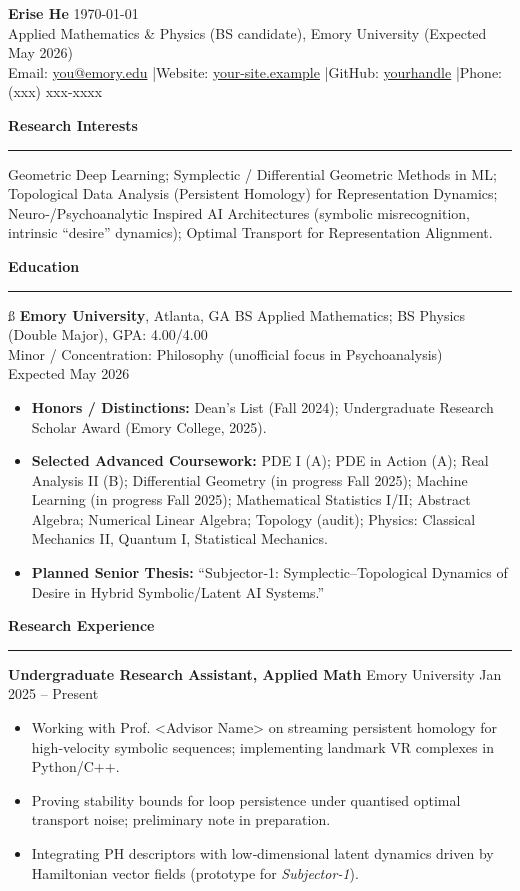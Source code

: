 \documentclass[11pt]{article}
\newcommand{\cvsection}[1]{%
  \vspace{1.25em}%
  \textbf{\large #1}%
  \vspace{0.5em}\hrule\vspace{0.6em}
}
\newcommand{\cvheading}[3]{\textbf{#1} \hfill #2 \hfill #3}
\newcommand{\cvedu}[5]{%
  \textbf{#1}, #2 \hfill #3\\%
  #4 \\
  #5 \par
}
\newenvironment{cvitems}{\begin{itemize}[leftmargin=*,topsep=2pt,itemsep=2pt]}{\end{itemize}}
\begin{document}
{\LARGE \textbf{Erise He}} \hfill \today\\
Applied Mathematics \& Physics (BS candidate), Emory University (Expected May 2026)\\
Email: \href{mailto:you@emory.edu}{you@emory.edu} \quad|\quad Website: \href{https://your-site.example}{your-site.example} \quad|\quad GitHub: \href{https://github.com/yourhandle}{yourhandle} \quad|\quad Phone: (xxx) xxx-xxxx

\cvsection{Research Interests}
Geometric Deep Learning; Symplectic / Differential Geometric Methods in ML; Topological Data Analysis (Persistent Homology) for Representation Dynamics; Neuro‑/Psychoanalytic Inspired AI Architectures (symbolic misrecognition, intrinsic “desire” dynamics); Optimal Transport for Representation Alignment.

\cvsection{Education}ß
\cvedu{Emory University}{Atlanta, GA}{BS Applied Mathematics; BS Physics (Double Major), GPA: 4.00/4.00}{Minor / Concentration: Philosophy (unofficial focus in Psychoanalysis)}{Expected May 2026}

\begin{cvitems}
  \item \textbf{Honors / Distinctions:} Dean’s List (Fall 2024); Undergraduate Research Scholar Award (Emory College, 2025).
  \item \textbf{Selected Advanced Coursework:} PDE I (A); PDE in Action (A); Real Analysis II (B); Differential Geometry (in progress Fall 2025); Machine Learning (in progress Fall 2025); Mathematical Statistics I/II; Abstract Algebra; Numerical Linear Algebra; Topology (audit); Physics: Classical Mechanics II, Quantum I, Statistical Mechanics.
  \item \textbf{Planned Senior Thesis:} “Subjector‑1: Symplectic–Topological Dynamics of Desire in Hybrid Symbolic/Latent AI Systems.”
\end{cvitems}

\cvsection{Research Experience}

\cvheading{Undergraduate Research Assistant, Applied Math}{Emory University}{Jan 2025 -- Present}
\begin{cvitems}
  \item Working with Prof. <Advisor Name> on streaming persistent homology for high‑velocity symbolic sequences; implementing landmark VR complexes in Python/C++.
  \item Proving stability bounds for loop persistence under quantised optimal transport noise; preliminary note in preparation.
  \item Integrating PH descriptors with low‑dimensional latent dynamics driven by Hamiltonian vector fields (prototype for \emph{Subjector‑1}).
\end{cvitems}
\end{document}
